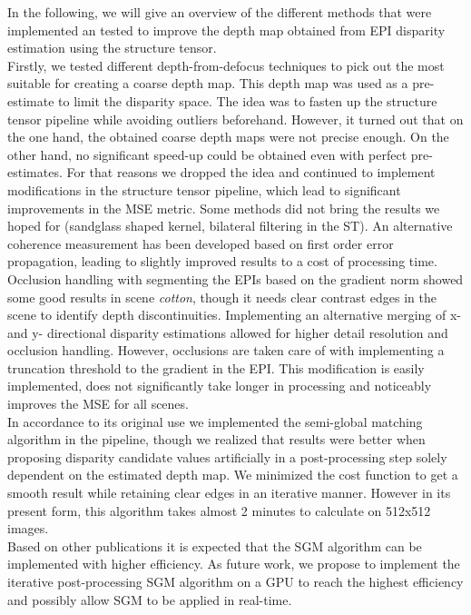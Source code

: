 \documentclass  [
  paper    = a4,
  BCOR     = 10mm,
  twoside,
  fontsize = 12pt,
  fleqn,
  toc      = bibnumbered,
  toc      = listofnumbered,
  numbers  = noendperiod,
  headings = normal,
  listof   = leveldown,
  version  = 3.03
]                                       {scrreprt}
\begin{document}
In the following, we will give an overview of the different methods that were implemented an tested to improve the depth map obtained from EPI disparity estimation using the structure tensor.\\
Firstly, we tested different depth-from-defocus techniques to pick out the most suitable for creating a coarse depth map. This depth map was used as a pre-estimate to limit the disparity space. The idea was to fasten up the structure tensor pipeline while avoiding outliers beforehand. However, it turned out that on the one hand, the obtained coarse depth maps were not precise enough. On the other hand, no significant speed-up could be obtained even with perfect pre-estimates. For that reasons we dropped the idea and continued to implement modifications in the structure tensor pipeline, which lead to significant improvements in the MSE metric. Some methods did not bring the results we hoped for (sandglass shaped kernel, bilateral filtering in the ST).
An alternative coherence measurement has been developed based on first order error propagation, leading to slightly improved results to a cost of processing time. Occlusion handling with segmenting the EPIs based on the gradient norm showed some good results in scene \textit{cotton}, though it needs clear contrast edges in the scene to identify depth discontinuities. Implementing an alternative merging of x- and y- directional disparity estimations allowed for higher detail resolution and occlusion handling. However, occlusions are taken care of with implementing a truncation threshold to the gradient in the EPI. This modification is easily implemented, does not significantly take longer in processing and noticeably improves the MSE for all scenes. \\
In accordance to its original use we implemented the semi-global matching algorithm in the pipeline, though we realized that results were better when proposing disparity candidate values artificially in a post-processing step solely dependent on the estimated depth map. We minimized the cost function to get a smooth result while retaining clear edges in an iterative manner. However in its present form, this algorithm takes almost 2 minutes to calculate on 512x512 images.
\\
Based on other publications it is expected that the SGM algorithm can be implemented with higher efficiency. As future work, we propose to implement the iterative post-processing SGM algorithm on a GPU to reach the highest efficiency and possibly allow SGM to be applied in real-time.\\
\end{document}
